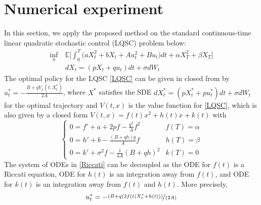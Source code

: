 \documentclass{article}
\newtheorem{remark}{Remark}[section]
\numberwithin{equation}{section}
\begin{document}
\section{Numerical experiment}
\label{sec:numerics}
In this section, we apply the proposed method on the standard continuous-time linear quadratic stochastic control (LQSC) problem below:
\begin{equation}\label{LQSC}
\begin{split}
    \inf_u~&\mathbb{E}\bigg[\int_0^T\big(aX_t^2+bX_t+Au_t^2+Bu_t \big)dt+\alpha X_T^2+\beta X_T\bigg]\\
    &dX_{t}=(p X_t+q u_t)dt+\sigma dW_t
\end{split}
\end{equation}
The optimal policy for the LQSC \eqref{LQSC} can be given in closed from by $u^*_t=-\frac{B+q V_x(t,X^*_t)}{2A}$, where $X^*$ satisfies the SDE $dX^*_{t}=(p X^*_t+p u^*_t)dt+\sigma dW_t$ for the optimal trajectory and 
$V(t,x)$ is the value function for \eqref{LQSC}, which is also given by a closed form $V(t,x)=f(t)x^2+h(t)x+k(t)$ with
\begin{equation}\label{Riccati}
         \begin{cases}
             0=f'+a+2pf-\frac{q^2}{A}f^2&  f(T)=\alpha\\
             0=h'+b-\frac{(B+qh)q}{A}f&  h(T)=\beta\\
             0=k'+\sigma^2 f-\frac{1}{4A}(B+qh)^2&  k(T)=0
         \end{cases}
\end{equation}
The system of ODEs in \eqref{Riccati} can be decoupled as the ODE for $f(t)$ is a Riccati equation, ODE for $h(t)$ is an integration away from $f(t)$, and ODE for $k(t)$ is an integration away from $f(t)$ and $h(t)$. More precisely, 
\[
u^*_t=-\nicefrac{(B+q(2f(t)X_t^*+h(t)))}{(2A)}
\]
\end{document}
